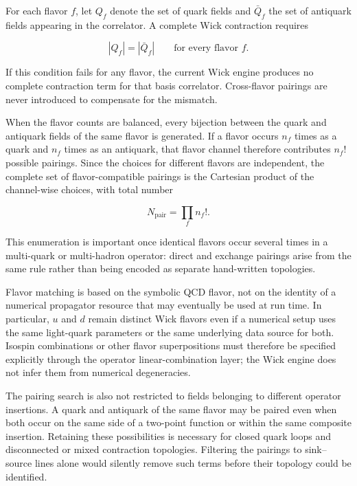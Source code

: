\documentclass[11pt]{article}
\begin{document}
For each flavor \(f\), let \(Q_f\) denote the set of quark fields and
\(\bar Q_f\) the set of antiquark fields appearing in the correlator. A
complete Wick contraction requires

\begin{equation}
|Q_f| = |\bar Q_f|
\qquad
\text{for every flavor } f.
\label{eq:wick_flavor_balance}
\end{equation}

If this condition fails for any flavor, the current Wick engine produces no
complete contraction term for that basis correlator. Cross-flavor pairings are
never introduced to compensate for the mismatch.

When the flavor counts are balanced, every bijection between the quark and
antiquark fields of the same flavor is generated. If a flavor occurs
\(n_f\) times as a quark and \(n_f\) times as an antiquark, that flavor channel
therefore contributes \(n_f!\) possible pairings. Since the choices for
different flavors are independent, the complete set of flavor-compatible
pairings is the Cartesian product of the channel-wise choices, with total
number

\begin{equation}
N_{\mathrm{pair}}
=
\prod_f n_f! .
\label{eq:number_wick_pairings}
\end{equation}

This enumeration is important once identical flavors occur several times in a
multi-quark or multi-hadron operator: direct and exchange pairings arise from
the same rule rather than being encoded as separate hand-written topologies.

Flavor matching is based on the symbolic QCD flavor, not on the identity of a
numerical propagator resource that may eventually be used at run time. In
particular, \(u\) and \(d\) remain distinct Wick flavors even if a numerical
setup uses the same light-quark parameters or the same underlying data source
for both. Isospin combinations or other flavor superpositions must therefore
be specified explicitly through the operator linear-combination layer; the
Wick engine does not infer them from numerical degeneracies.

The pairing search is also not restricted to fields belonging to different
operator insertions. A quark and antiquark of the same flavor may be paired even
when both occur on the same side of a two-point function or within the same
composite insertion. Retaining these possibilities is necessary for closed
quark loops and disconnected or mixed contraction topologies. Filtering the
pairings to sink--source lines alone would silently remove such terms before
their topology could be identified.
\end{document}
